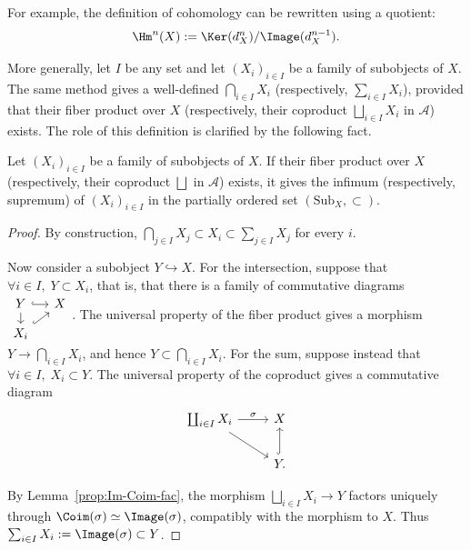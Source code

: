 For example, the definition of cohomology can be rewritten using a quotient:
\[ \Hm^n(X) := \Ker(d_X^n)/\Image(d_X^{n-1}). \]

More generally, let $I$ be any set and let $(X_i)_{i\in I}$ be a family of
subobjects of $X$. The same method gives a well-defined
$\bigcap_{i\in I}X_i$ (respectively, $\sum_{i\in I}X_i$), provided that
their fiber product over $X$ (respectively, their coproduct
$\bigsqcup_{i\in I}X_i$ in $\mathcal{A}$) exists. The role of this
definition is clarified by the following fact.

\begin{proposition}\label{prop:subobject-inf-sup}
	Let $(X_i)_{i\in I}$ be a family of subobjects of $X$. If their fiber
	product over $X$ (respectively, their coproduct $\bigsqcup$ in
	$\mathcal{A}$) exists, it gives the infimum (respectively, supremum) of
	$(X_i)_{i\in I}$ in the partially ordered set
	$(\mathrm{Sub}_X,\subset)$.
\end{proposition}
\begin{proof}
	By construction,
	$\bigcap_{j\in I}X_j\subset X_i\subset\sum_{j\in I}X_j$ for every $i$.

	Now consider a subobject $Y\hookrightarrow X$. For the intersection,
	suppose that $\forall i\in I,\;Y\subset X_i$, that is, that there is a
	family of commutative diagrams
	$\begin{tikzcd}[row sep=small, column sep=small]
		Y \arrow[hookrightarrow, r] \arrow[d] & X \\
		X_i \arrow[hookrightarrow, ru] &
	\end{tikzcd}$.
	The universal property of the fiber product gives a morphism
	$Y\to\bigcap_{i\in I}X_i$, and hence
	$Y\subset\bigcap_{i\in I}X_i$. For the sum, suppose instead that
	$\forall i\in I,\;X_i\subset Y$. The universal property of the
	coproduct gives a commutative diagram
	\[\begin{tikzcd}
		\coprod_{i \in I} X_i \arrow[r, "\sigma"] \arrow[rd] & X \\
		& Y \arrow[hookrightarrow, u].
	\end{tikzcd}\]

	By Lemma~\ref{prop:Im-Coim-fac}, the morphism
	$\bigsqcup_{i\in I}X_i\to Y$ factors uniquely through
	$\Coim(\sigma)\simeq\Image(\sigma)$, compatibly with the morphism to $X$.
	Thus $\sum_{i\in I}X_i:=\Image(\sigma)\subset Y$.
\end{proof}

